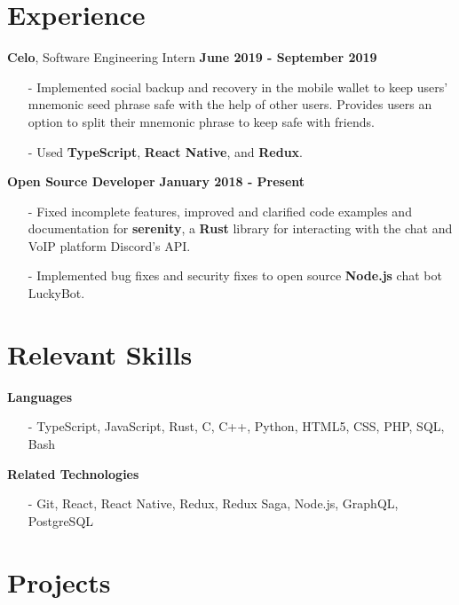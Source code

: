 \documentclass[margin,line]{res}
\begin{document}
\begin{resume}
\section{\sc Experience}
  {\bf Celo}, Software Engineering Intern \hfill {\bf June 2019 - September 2019} \\
  \vspace{-3.5mm}
  \begin{itemize} \itemsep -2pt
    \item[-] Implemented social backup and recovery in the mobile wallet to keep
    users' mnemonic seed phrase safe with the help of other users. Provides
    users an option to split their mnemonic phrase to keep safe with friends.
    \item[-] Used {\bf TypeScript}, {\bf React Native}, and {\bf Redux}.
  \end{itemize}
  {\bf Open Source Developer} \hfill {\bf January 2018 - Present} \\
  \vspace{-3.5mm}
  \begin{itemize} \itemsep -2pt
    \item[-] Fixed incomplete features, improved and clarified code examples and documentation for
    {\bf serenity}, a {\bf Rust} library for interacting with the chat and VoIP platform Discord's API. 
    \item[-] Implemented bug fixes and security fixes to open source {\bf Node.js} chat bot LuckyBot.
  \end{itemize}

\section{\sc Relevant Skills}
  {\bf Languages}
  \begin{itemize} \itemsep -2pt
    \item[-] TypeScript, JavaScript, Rust, C, C++, Python, HTML5, CSS, PHP, SQL, Bash
  \end{itemize}
  {\bf Related Technologies}
  \begin{itemize} \itemsep -2pt
    \item[-] Git, React, React Native, Redux, Redux Saga, Node.js, GraphQL, PostgreSQL
  \end{itemize}

\section{\sc Projects}


\end{resume}
\end{document}
